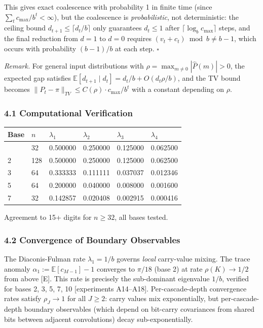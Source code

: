 \documentclass[
  11pt,
]{article}
\begin{document}
This gives exact coalescence with probability 1 in finite time (since
\(\sum_t c_{\max}/b^t < \infty\)), but the coalescence is \emph{probabilistic},
not deterministic: the ceiling bound \(d_{t+1} \leq \lceil d_t/b \rceil\) only
guarantees \(d_t \leq 1\) after \(\lceil\log_b c_{\max}\rceil\) steps, and the
final reduction from \(d = 1\) to \(d = 0\) requires
\((v_t + c_t) \bmod b \neq b - 1\), which occurs with probability \((b-1)/b\) at
each step. \(\square\)

\emph{Remark.} For general input distributions with
\(\rho = \max_{m \neq 0}|\hat{P}(m)| > 0\), the expected gap satisfies
\(\mathbb{E}[d_{t+1} \mid d_t] = d_t/b + O(d_t \rho/b)\), and the TV bound
becomes \(\|P_t - \pi\|_{TV} \leq C(\rho) \cdot c_{\max}/b^t\) with a constant
depending on \(\rho\).

\subsubsection{4.1 Computational Verification}\label{computational-verification}

\begin{longtable}[]{@{}llllll@{}}
\toprule\noalign{}
Base & \(n\) & \(\lambda_1\) & \(\lambda_2\) & \(\lambda_3\) & \(\lambda_4\) \\
\midrule\noalign{}
\endhead
\bottomrule\noalign{}
\endlastfoot
2 & 32 & 0.500000 & 0.250000 & 0.125000 & 0.062500 \\
2 & 128 & 0.500000 & 0.250000 & 0.125000 & 0.062500 \\
3 & 64 & 0.333333 & 0.111111 & 0.037037 & 0.012346 \\
5 & 64 & 0.200000 & 0.040000 & 0.008000 & 0.001600 \\
7 & 32 & 0.142857 & 0.020408 & 0.002915 & 0.000416 \\
\end{longtable}

Agreement to 15+ digits for \(n \geq 32\), all bases tested.

\subsubsection{4.2 Convergence of Boundary
Observables}\label{convergence-of-boundary-observables}

The Diaconis-Fulman rate \(\lambda_1 = 1/b\) governs \emph{local} carry-value
mixing. The trace anomaly \(\alpha_1 := \mathbb{E}[c_{M-1}] - 1\) converges to
\(\pi/18\) (base 2) at rate \(\rho(K) \to 1/2\) from above {[}E{]}. This rate is
precisely the sub-dominant eigenvalue \(1/b\), verified for bases 2, 3, 5, 7, 10
{[}experiments A14--A18{]}. Per-cascade-depth convergence rates satisfy
\(\rho_J \to 1\) for all \(J \geq 2\): carry values mix exponentially, but
per-cascade-depth boundary observables (which depend on bit-carry covariances
from shared bits between adjacent convolutions) decay sub-exponentially.
\end{document}
